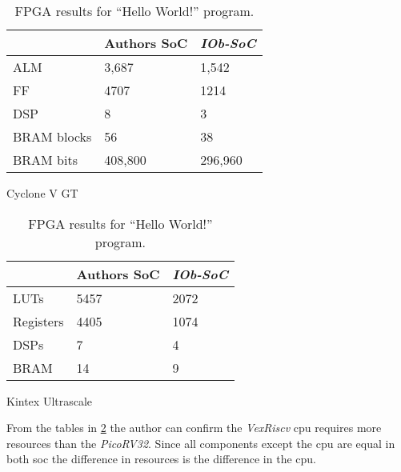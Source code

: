 \begin{table}[h]
    \begin{subtable}[h]{0.45\textwidth}
        \centering
        \begin{tabular}{l|l|l|}
            \cline{2-3}
                                              & Authors SoC & \textit{IOb-SoC} \\ \hline
            \multicolumn{1}{|l|}{ALM}         & 3,687       & 1,542            \\ \hline
            \multicolumn{1}{|l|}{FF}          & 4707        & 1214             \\ \hline
            \multicolumn{1}{|l|}{DSP}         & 8           & 3                \\ \hline
            \multicolumn{1}{|l|}{BRAM blocks} & 56          & 38               \\ \hline
            \multicolumn{1}{|l|}{BRAM bits}   & 408,800     & 296,960          \\ \hline
        \end{tabular}
       \caption{Cyclone V GT}
       \label{tab:cyclone_hello_int_mem}
    \end{subtable}
    \hfill
    \begin{subtable}[h]{0.45\textwidth}
        \centering
        \begin{tabular}{l|l|l|}
            \cline{2-3}
                                            & Authors SoC & \textit{IOb-SoC} \\ \hline
            \multicolumn{1}{|l|}{LUTs}      & 5457        & 2072             \\ \hline
            \multicolumn{1}{|l|}{Registers} & 4405        & 1074             \\ \hline
            \multicolumn{1}{|l|}{DSPs}      & 7           & 4                \\ \hline
            \multicolumn{1}{|l|}{BRAM}      & 14          & 9                \\ \hline
        \end{tabular}
        \caption{Kintex Ultrascale}
        \label{tab:kintex_hello_int_mem}
     \end{subtable}
     \caption{FPGA results for \enquote{Hello World!} program.}
     \label{tab:fpga_hello_int_mem}
\end{table}

From the tables in \ref{tab:fpga_hello_int_mem} the author can confirm the \textit{VexRiscv} \acrshort{cpu} requires more resources than the \textit{PicoRV32}. Since all components except the \acrshort{cpu} are equal in both \acrshort{soc} the difference in resources is the difference in the \acrshort{cpu}.

